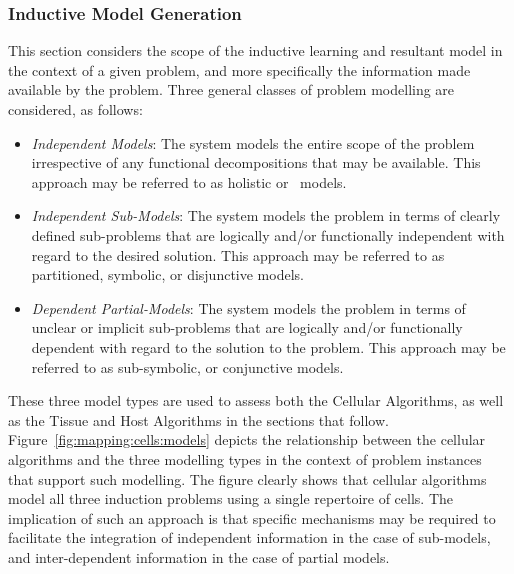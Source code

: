 %
%
\subsubsection{Inductive Model Generation}
This section considers the scope of the inductive learning and resultant model in the context of a given problem, and more specifically the information made available by the problem. Three general classes of problem modelling are considered, as follows: 

\begin{itemize}
	\item \emph{Independent Models}: The system models the entire scope of the problem irrespective of any functional decompositions that may be available. This approach may be referred to as holistic or \naive\ models.
	\item \emph{Independent Sub-Models}: The system models the problem in terms of clearly defined sub-problems that are logically and/or functionally independent with regard to the desired solution. This approach may be referred to as partitioned, symbolic, or disjunctive models.
	\item \emph{Dependent Partial-Models}: The system models the problem in terms of unclear or implicit sub-problems that are logically and/or functionally dependent with regard to the solution to the problem. This approach may be referred to as sub-symbolic, or conjunctive models.
\end{itemize}

These three model types are used to assess both the Cellular Algorithms, as well as the Tissue and Host Algorithms in the sections that follow. 
Figure~\ref{fig:mapping:cells:models} depicts the relationship between the cellular algorithms and the three modelling types in the context of problem instances that support such modelling. 
The figure clearly shows that cellular algorithms model all three induction problems using a single repertoire of cells. The implication of such an approach is that specific mechanisms may be required to facilitate the integration of independent information in the case of sub-models, and inter-dependent information in the case of partial models.

